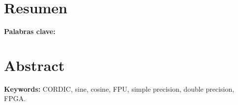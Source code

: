 \chapter*{Resumen}
\thispagestyle{empty}



\bigskip

\textbf{Palabras clave:} \scriptKeywords

\clearpage
\chapter*{Abstract}
\thispagestyle{empty}



\bigskip

\textbf{Keywords:} CORDIC, sine, cosine, FPU, simple precision, double precision, FPGA. 

\cleardoublepage

